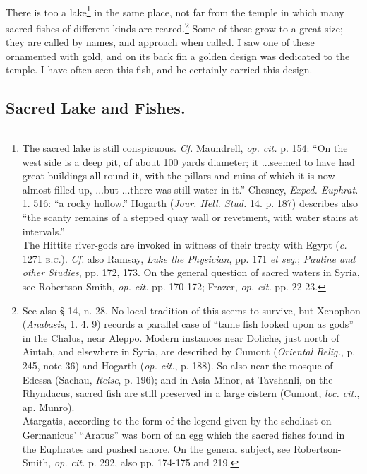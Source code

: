 \documentclass[a4paper, 11pt, oneside, polutonikogreek, english]{article}
\begin{document}
\paragraph{}
There is too a lake\footnote{The sacred lake is still conspicuous. \emph{Cf.} Maundrell, \emph{op. cit.} p. 154: ``On the west side is a deep pit, of about 100 yards diameter; it ...seemed to have had great buildings all round it, with the pillars and ruins of which it is now almost filled up, ...but ...there was still water in it.'' Chesney, \emph{Exped. Euphrat.} 1. 516: ``a rocky hollow.'' Hogarth (\emph{Jour. Hell. Stud.} 14. p. 187) describes also ``the scanty remains of a stepped quay wall or revetment, with water stairs at intervals.''\\\hspace*{5mm}The Hittite river-gods are invoked in witness of their treaty with Egypt (\emph{c.} 1271 \textsc{b.c.}). \emph{Cf.} also Ramsay, \emph{Luke the Physician}, pp. 171 \emph{et seq.}; \emph{Pauline and other Studies}, pp. 172, 173. On the general question of sacred waters in Syria, see Robertson-Smith, \emph{op. cit.} pp. 170-172; Frazer, \emph{op. cit.} pp. 22-23.} in the same place, not far from the temple in which many sacred fishes of different kinds are reared.\footnote{See also § 14, n. 28. No local tradition of this seems to survive, but Xenophon (\emph{Anabasis}, 1. 4. 9) records a parallel case of ``tame fish looked upon as gods'' in the Chalus, near Aleppo. Modern instances near Doliche, just north of Aintab, and elsewhere in Syria, are described by Cumont (\emph{Oriental Relig.}, p. 245, note 36) and Hogarth (\emph{op. cit.}, p. 188). So also near the mosque of Edessa (Sachau, \emph{Reise}, p. 196); and in Asia Minor, at Tavshanli, on the Rhyndacus, sacred fish are still preserved in a large cistern (Cumont, \emph{loc. cit.}, ap. Munro).\\\hspace*{5mm}Atargatis, according to the form of the legend given by the scholiast on Germanicus' ``Aratus'' was born of an egg which the sacred fishes found in the Euphrates and pushed ashore. On the general subject, see Robertson-Smith, \emph{op. cit.} p. 292, also pp. 174-175 and 219.} Some of these grow to a great size; they are called by names, and approach when called. I saw one of these ornamented with gold, and on its back fin a golden design was dedicated to the temple. I have often seen this fish, and he certainly carried this design.

\subsection{Sacred Lake and Fishes.}
\end{document}
